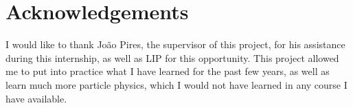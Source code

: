 \documentclass[EPJ,twocolumn]{webofc}
\begin{document}
\section*{Acknowledgements}
I would like to thank João Pires, the supervisor of this project, for his assistance during this internship, as well as LIP for this opportunity. This project allowed me to put into practice what I have learned for the past few years, as well as learn much more particle physics, which I would not have learned in any course I have available.


\appendix 





\end{document}
